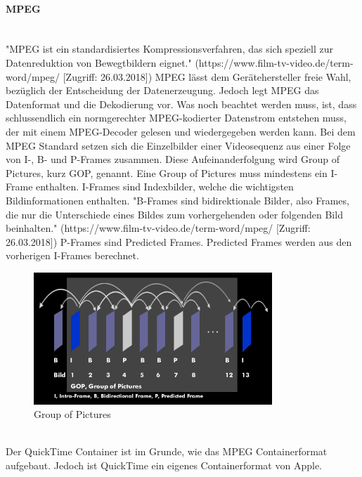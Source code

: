 \paragraph{MPEG}
\leavevmode \\
"MPEG ist ein standardisiertes Kompressionsverfahren, das sich speziell zur Datenreduktion von Bewegtbildern eignet." (https://www.film-tv-video.de/term-word/mpeg/ [Zugriff: 26.03.2018]) MPEG lässt dem Gerätehersteller freie Wahl, bezüglich der Entscheidung der Datenerzeugung. Jedoch legt MPEG das Datenformat und die Dekodierung vor. Was noch beachtet werden muss, ist, dass schlussendlich ein normgerechter MPEG-kodierter Datenstrom entstehen muss, der mit einem MPEG-Decoder gelesen und wiedergegeben werden kann. Bei dem MPEG Standard setzen sich die Einzelbilder einer Videosequenz aus einer Folge von I-, B- und P-Frames zusammen. Diese Aufeinanderfolgung wird Group of Pictures, kurz GOP, genannt. Eine Group of Pictures muss mindestens ein I-Frame enthalten. I-Frames sind Indexbilder, welche die wichtigsten Bildinformationen enthalten. "B-Frames sind  bidirektionale Bilder, also Frames, die nur die Unterschiede eines Bildes zum vorhergehenden oder folgenden Bild beinhalten." (https://www.film-tv-video.de/term-word/mpeg/ [Zugriff: 26.03.2018]) P-Frames sind Predicted Frames. Predicted Frames werden aus den vorherigen I-Frames berechnet.\newline
\begin{figure}[H]
	\centering
	\includegraphics[width=0.8\textwidth]{abb27} 
	\caption[Group of Pictures]{Group of Pictures\footnotemark}
\end{figure}
\leavevmode \\
Der QuickTime Container ist im Grunde, wie das MPEG Containerformat aufgebaut. Jedoch ist QuickTime ein eigenes Containerformat von Apple.\citep{mpeg}
